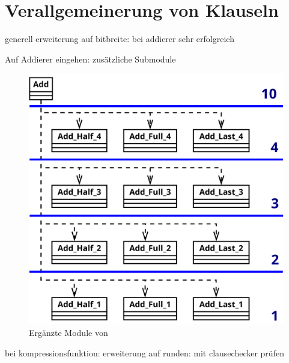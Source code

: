 \section{Verallgemeinerung von Klauseln}
\label{sec:ana:generalize}

generell erweiterung auf bitbreite: bei addierer sehr erfolgreich

Auf Addierer eingehen: zusätzliche Submodule
\begin{figure}[!h]
  \centering
  \includegraphics[scale=0.265]{images/module_add}
  \caption{Ergänzte Module von }
  \label{fig:sha256_module_add}
\end{figure}


bei kompressionsfunktion: erweiterung auf runden: mit clausechecker prüfen

